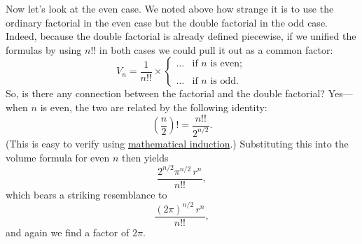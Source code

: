 Now let's look at the even case. We noted above how strange it is to use the ordinary factorial in the even case but the double factorial in the odd case. Indeed, because the double factorial is already defined piecewise, if we unified the formulas by using $n!!$ in both cases we could pull it out as a common factor:
\[
V_n = \frac{1}{n!!}\times \begin{cases}
\ldots & \text{if } n \text{ is even}; \\ \\
 \ldots & \text{if } n \text{ is odd}.
 \end{cases}
\]
So, is there any connection between the factorial and the double factorial? Yes---when $n$ is even, the two are related by the following identity:
\[ \left(\frac{n}{2}\right)! = \frac{n!!}{2^{n/2}}. \]
(This is easy to verify using \href{http://en.wikipedia.org/wiki/Mathematical_induction}{mathematical induction}.) Substituting this into the volume formula for even $n$ then yields
\[ \frac{2^{n/2}\pi^{n/2}\,r^n}{n!!}, \]
which bears a striking resemblance to
\[ \frac{(2\pi)^{n/2}\,r^n}{n!!}, \]
and again we find a factor of $2\pi$.


